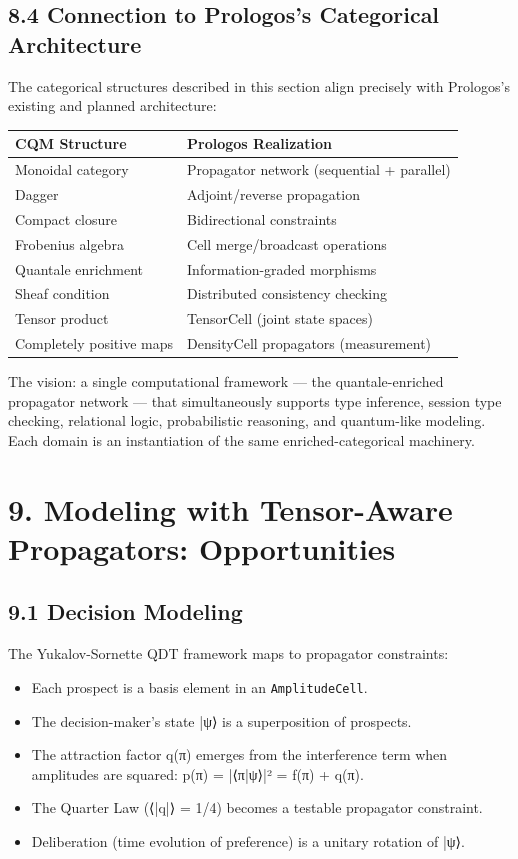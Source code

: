 \documentclass[11pt]{article}
\begin{document}
\subsection{8.4 Connection to Prologos's Categorical Architecture}
\label{sec:orgfec449b}

The categorical structures described in this section align precisely with
Prologos's existing and planned architecture:

\begin{center}
\begin{tabular}{ll}
CQM Structure & Prologos Realization\\
\hline
Monoidal category & Propagator network (sequential + parallel)\\
Dagger & Adjoint/reverse propagation\\
Compact closure & Bidirectional constraints\\
Frobenius algebra & Cell merge/broadcast operations\\
Quantale enrichment & Information-graded morphisms\\
Sheaf condition & Distributed consistency checking\\
Tensor product & TensorCell (joint state spaces)\\
Completely positive maps & DensityCell propagators (measurement)\\
\end{tabular}
\end{center}

The vision: a single computational framework --- the quantale-enriched
propagator network --- that simultaneously supports type inference, session
type checking, relational logic, probabilistic reasoning, and quantum-like
modeling. Each domain is an instantiation of the same enriched-categorical
machinery.
\section{9. Modeling with Tensor-Aware Propagators: Opportunities}
\label{sec:org40f908e}

\subsection{9.1 Decision Modeling}
\label{sec:org2b484dc}

The Yukalov-Sornette QDT framework maps to propagator constraints:

\begin{itemize}
\item Each prospect is a basis element in an \texttt{AmplitudeCell}.
\item The decision-maker's state |ψ⟩ is a superposition of prospects.
\item The attraction factor q(π) emerges from the interference term when
amplitudes are squared: p(π) = |⟨π|ψ⟩|² = f(π) + q(π).
\item The Quarter Law (⟨|q|⟩ = 1/4) becomes a testable propagator constraint.
\item Deliberation (time evolution of preference) is a unitary rotation of |ψ⟩.
\end{itemize}
\end{document}
